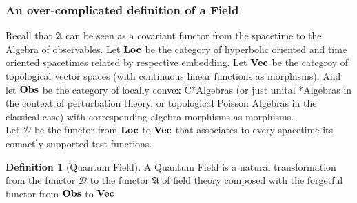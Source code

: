\documentclass[a4paper,11pt]{article}
\numberwithin{equation}{section}
\theoremstyle{definition}
\newtheorem{definition}{Definition}
\begin{document}
\subsubsection{An over-complicated definition of a Field}
        Recall that $\mathfrak{A}$ can be seen as a covariant functor from the spacetime to the Algebra of observables. Let $\bold{Loc}$ be the category of hyperbolic oriented and time oriented spacetimes related by respective embedding. Let $\bold{Vec}$ be the categroy of topological vector spaces (with continuous linear functions as morphisms). And let $\bold{Obs}$ be the category of locally convex C*Algebras (or just unital *Algebras in the context of perturbation theory, or topological Poisson Algebras in the classical case) with corresponding algebra morphisms as morphisms.\\
Let $\mathcal{D}$ be the functor from $\bold{Loc}$ to $\bold{Vec}$ that associates to every spacetime its comactly supported test functions.

\begin{definition}[Quantum Field]
    A Quantum Field is a natural transformation from the functor $\mathcal{D}$ to the functor $\mathfrak{A}$ of field theory composed with the forgetful functor from $\bold{Obs}$ to $\bold{Vec}$
\end{definition}
\end{document}
